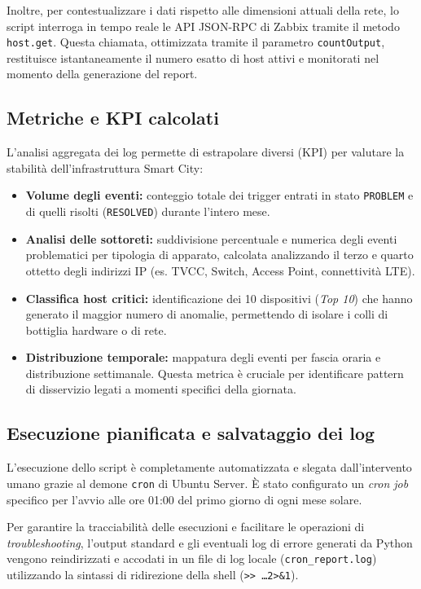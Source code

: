 \documentclass[12pt, a4paper]{report}
\begin{document}
Inoltre, per contestualizzare i dati rispetto alle dimensioni attuali della rete, 
lo script interroga in tempo reale le API JSON-RPC di Zabbix tramite il metodo \texttt{host.get}. 
Questa chiamata, ottimizzata tramite il parametro \texttt{countOutput}, restituisce istantaneamente il numero esatto di host attivi 
e monitorati nel momento della generazione del report.

\subsection{Metriche e KPI calcolati}
L'analisi aggregata dei log permette di estrapolare diversi (KPI) per valutare la stabilità dell'infrastruttura Smart City:
\begin{itemize}
    \item \textbf{Volume degli eventi:} conteggio totale dei trigger entrati in stato \texttt{PROBLEM} 
    e di quelli risolti (\texttt{RESOLVED}) durante l'intero mese.
    \item \textbf{Analisi delle sottoreti:} suddivisione percentuale e numerica degli eventi problematici per tipologia di apparato,
     calcolata analizzando il terzo e quarto ottetto degli indirizzi IP (es. TVCC, Switch, Access Point, connettività LTE).
    \item \textbf{Classifica host critici:} identificazione dei 10 dispositivi (\textit{Top 10}) 
    che hanno generato il maggior numero di anomalie, permettendo di isolare i colli di bottiglia hardware o di rete.
    \item \textbf{Distribuzione temporale:} mappatura degli eventi per fascia oraria e distribuzione settimanale. 
    Questa metrica è cruciale per identificare pattern di disservizio legati a momenti specifici della giornata.
\end{itemize}

\subsection{Esecuzione pianificata e salvataggio dei log}
L'esecuzione dello script è completamente automatizzata e slegata dall'intervento umano grazie al demone \texttt{cron} di Ubuntu Server. 
È stato configurato un \textit{cron job} specifico per l'avvio alle ore 01:00 del primo giorno di ogni mese solare. 

Per garantire la tracciabilità delle esecuzioni e facilitare le operazioni di \textit{troubleshooting}, 
l'output standard e gli eventuali log di errore generati da Python vengono reindirizzati e accodati in un file di log locale 
(\texttt{cron\_report.log}) utilizzando la sintassi di ridirezione della shell (\texttt{>> \dots 2>\&1}).
\end{document}
